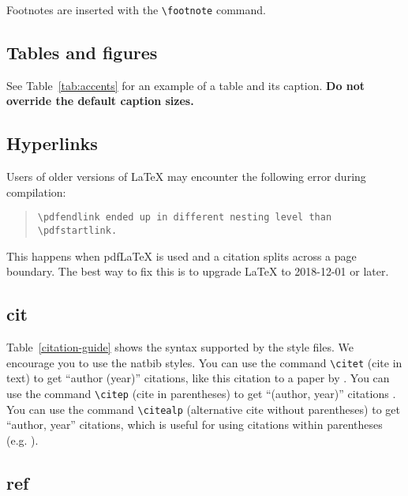 \documentclass[11pt]{article}
\begin{document}
Footnotes are inserted with the \verb|\footnote| command.%

\subsection{Tables and figures}

See Table~\ref{tab:accents} for an example of a table and its caption.
\textbf{Do not override the default caption sizes.}

\subsection{Hyperlinks}

Users of older versions of \LaTeX{} may encounter the following error during compilation: 
\begin{quote}
\tt\verb|\pdfendlink| ended up in different nesting level than \verb|\pdfstartlink|.
\end{quote}
This happens when pdf\LaTeX{} is used and a citation splits across a page boundary. The best way to fix this is to upgrade \LaTeX{} to 2018-12-01 or later.

\subsection{cit}



Table~\ref{citation-guide} shows the syntax supported by the style files.
We encourage you to use the natbib styles.
You can use the command \verb|\citet| (cite in text) to get ``author (year)'' citations, like this citation to a paper by \citet{Gusfield:97}.
You can use the command \verb|\citep| (cite in parentheses) to get ``(author, year)'' citations \citep{Gusfield:97}.
You can use the command \verb|\citealp| (alternative cite without parentheses) to get ``author, year'' citations, which is useful for using citations within parentheses (e.g. \citealp{Gusfield:97}).

\subsection{ref}

\nocite{Ando2005,augenstein-etal-2016-stance,andrew2007scalable,rasooli-tetrault-2015,goodman-etal-2016-noise,harper-2014-learning}
\end{document}
